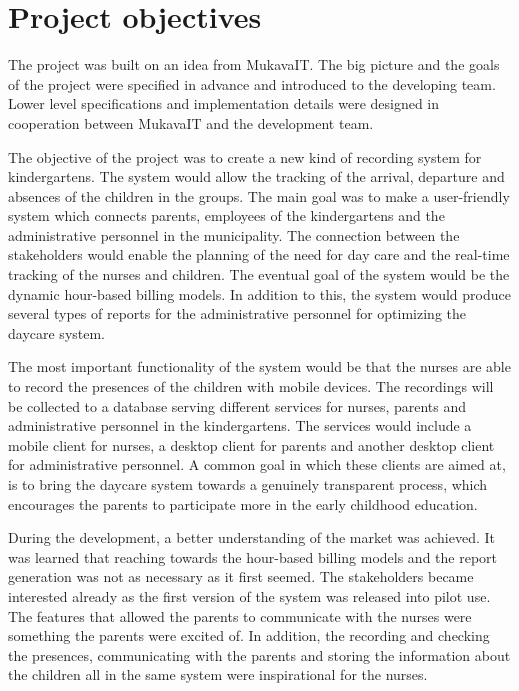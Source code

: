 
 \section{Project objectives}

The project was built on an idea from MukavaIT. The big picture and the goals of the project were specified in advance and introduced to the developing team. Lower level specifications and implementation details were designed in cooperation between MukavaIT and the development team.

The objective of the project was to create a new kind of recording system for kindergartens. The system would allow the tracking of the arrival, departure and absences of the children in the groups. The main goal was to make a user-friendly system which connects parents, employees of the kindergartens and the administrative personnel in the municipality. The connection between the stakeholders would enable the planning of the need for day care and the real-time tracking of the nurses and children. The eventual goal of the system would be the dynamic hour-based billing models. In addition to this, the system would produce several types of reports for the administrative personnel for optimizing the daycare system.

The most important functionality of the system would be that the nurses are able to record the presences of the children with mobile devices. The recordings will be collected to a database serving different services for nurses, parents and administrative personnel in the kindergartens. The services would include a mobile client for nurses, a desktop client for parents and another desktop client for administrative personnel. A common goal in which these clients are aimed at, is to bring the daycare system towards a genuinely transparent process, which encourages the parents to participate more in the early childhood education.

During the development, a better understanding of the market was achieved. It was learned that reaching towards the hour-based billing models and the report generation was not as necessary as it first seemed. The stakeholders became interested already as the first version of the system was released into pilot use. The features that allowed the parents to communicate with the nurses were something the parents were excited of. In addition, the recording and checking the presences, communicating with the parents and storing the information about the children all in the same system were inspirational for the nurses.

